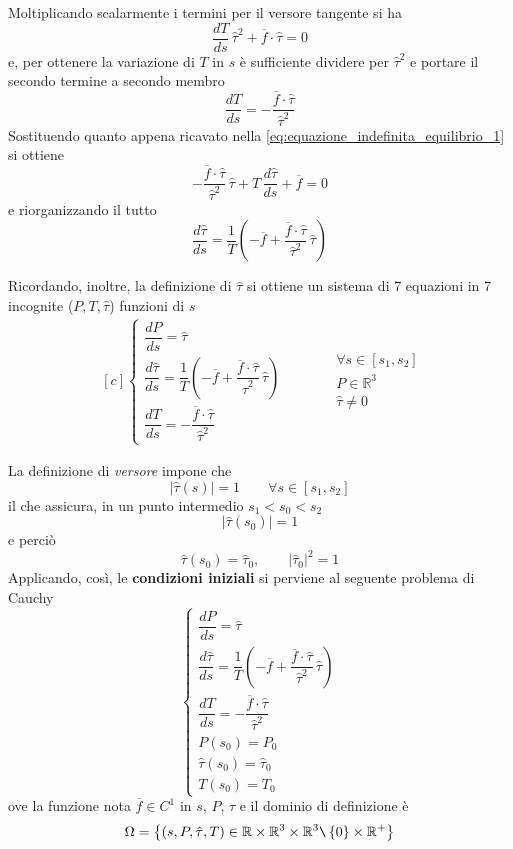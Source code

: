 Moltiplicando scalarmente i termini per il versore tangente si ha
\[
	\dfrac{dT}{ds}\,\hat{\tau}^2  + \overline{f}\cdot\hat{\tau} = 0
\]
e, per ottenere la variazione di $T$ in $s$ è sufficiente dividere per $\hat{\tau}^2$ e portare il secondo termine a secondo membro
\[
\dfrac{dT}{ds} = -\dfrac{\overline{f}\cdot\hat{\tau}}{\hat{\tau}^2}	
\]
Sostituendo quanto appena ricavato nella \eqref{eq:equazione_indefinita_equilibrio_1} si ottiene
\[
	-\dfrac{\overline{f}\cdot\hat{\tau}}{\hat{\tau}^2}\,\hat{\tau} + T\,\dfrac{d\hat{\tau}}{ds}+ \overline{f} = 0
\]
e riorganizzando il tutto
\[
\dfrac{d\hat{\tau}}{ds} = \dfrac{1}{T} \left(-\overline{f} + \dfrac{\overline{f}\cdot\hat{\tau}}{\hat{\tau}^2}\,\hat{\tau}\right)
\]

Ricordando, inoltre, la definizione di $\hat{\tau}$ si ottiene un sistema di 7 equazioni in 7 incognite ($P, T, \hat{\tau}$) funzioni di $s$
\begin{equation}
	\begin{aligned}[c]
		\begin{cases}
			\dfrac{dP}{ds} = \hat{\tau}\\[2ex]
			\dfrac{d\hat{\tau}}{ds} = \dfrac{1}{T} \left(-\overline{f} + \dfrac{\overline{f}\cdot\hat{\tau}}{\hat{\tau}^2}\,\hat{\tau}\right)\\[2ex]
			\dfrac{dT}{ds} = -\dfrac{\overline{f}\cdot\hat{\tau}}{\hat{\tau}^2}
		\end{cases}
	\end{aligned}
	\qquad 
	\begin{aligned}
		&\forall s\in[s_1, s_2]\\
		& P\in\mathbb{R}^3\\
		&\hat{\tau} \neq 0
	\end{aligned}
\end{equation}

La definizione di \emph{versore} impone che
\[
\left| \hat{\tau}(s)\right| = 1 \qquad \forall s\in[s_1, s_2]
\]
il che assicura, in un punto intermedio $s_1<s_0<s_2$
\[
	\left| \hat{\tau}(s_0)\right| = 1 
\]
e perciò
\[
\hat{\tau}(s_0)= \hat{\tau}_0,\qquad \left|\hat{\tau}_0\right|^2 = 1
\]
Applicando, così, le \textbf{condizioni iniziali} si perviene al seguente problema di Cauchy
\begin{equation}
	\label{eq:problema_cauchy}
	\begin{cases}
		\dfrac{dP}{ds} = \hat{\tau}\\[1.5ex]
		\dfrac{d\hat{\tau}}{ds} = \dfrac{1}{T} \left(-\overline{f} + \dfrac{\overline{f}\cdot\hat{\tau}}{\hat{\tau}^2}\,\hat{\tau}\right)\\[1.5ex]
		\dfrac{dT}{ds} = -\dfrac{\overline{f}\cdot\hat{\tau}}{\hat{\tau}^2}\\[1.5ex]
		P(s_0) = P_0\\
		\hat{\tau}(s_0)= \hat{\tau}_0\\
		T(s_0)=T_0
	\end{cases}
\end{equation}
ove la funzione nota $\overline{f}\in C^1$ in $s$, $P$, $\hat{\tau}$ e il dominio di definizione è
\[
\Omega = \left\{(s, P, \hat{\tau}, T)\in \mathbb{R}\times\mathbb{R}^3\times \mathbb{R}^3\texttt{\textbackslash}\left\{0\right\}\times \mathbb{R}^+\right\}
\]

